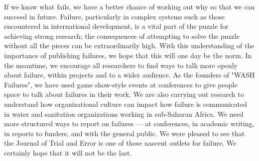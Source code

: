 \documentclass[twocolumn, serif, authordate, editorial]{jote-article}
\begin{document}
If we know what fails, we have a better chance of working out why so that we can succeed in future. Failure, particularly in complex systems such as those encountered in international development, is a vital part of the puzzle for achieving strong research; the consequences of attempting to solve the puzzle without all the pieces can be extraordinarily high. With this understanding of the importance of publishing failures, we hope that this will one day be the norm. In the meantime, we encourage all researchers to find ways to talk more openly about failure, within projects and to a wider audience. As the founders of "WASH Failures", we have used game show-style events at conferences to give people space to talk about failures in their work. We are also carrying out research to understand how organizational culture can impact how failure is communicated in water and sanitation organizations working in sub-Saharan Africa. We need more structured ways to report on failures — at conferences, in academic writing, in reports to funders, and with the general public. We were pleased to see that the Journal of Trial and Error is one of those nascent outlets for failure. We certainly hope that it will not be the last.


\setlength{\bibhang}{\parindent}
 {} 
\printbibliography
\end{document}
